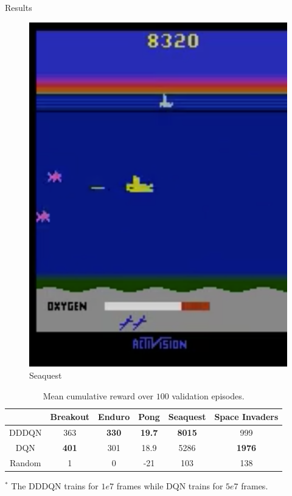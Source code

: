 \documentclass{beamer}
\begin{document}
\begin{frame}{Results}
\begin{minipage}[t]{\textwidth}
\begin{minipage}{0.3\textwidth}
\begin{figure}
    \includegraphics[height=0.35\textheight]{img/Seaquest}
    \caption*{Seaquest}
    \end{figure}
    \end{minipage}
\end{minipage}

\begin{minipage}[t]{\textwidth}
    \begin{table}
    \caption{Mean cumulative reward over $100$ validation episodes.}
    \begin{threeparttable}
        \begin{tabular}{||c c c c c c||}
        \hline
        & Breakout & Enduro & Pong & Seaquest & Space Invaders \\ [0.5ex]
        \hline\hline
        DDDQN & 363 & \textbf{330} & \textbf{19.7} & \textbf{8015} & 999 \\
        \hline
        DQN & \textbf{401} & 301 & 18.9 & 5286 & \textbf{1976} \\
        \hline
        Random & 1 & 0 & -21 & 103 & 138 \\
        \hline
        \end{tabular}
    \begin{tablenotes}
        \small
        \item $^*$ The DDDQN trains for $1e7$ frames while DQN trains for $5e7$ frames.
    \end{tablenotes}
    \end{threeparttable}
    \end{table}
\end{minipage}


\end{frame}
\end{document}
